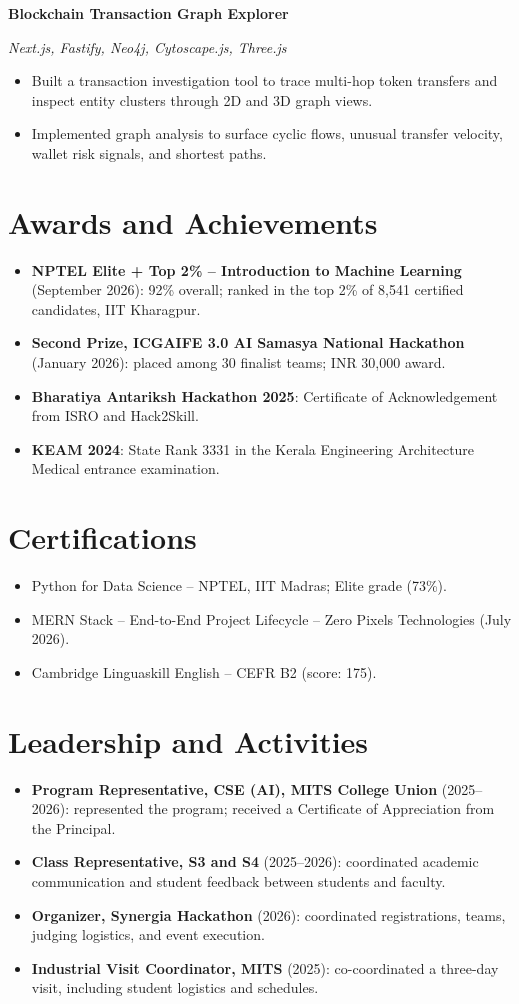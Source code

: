 \documentclass[a4paper,10pt]{article}
\newcommand{\project}[3]{%
  \noindent\textbf{#1}\hfill{\small #2}\par
  {\small\emph{#3}}\par\vspace{-2pt}%
}
\begin{document}
\project{Blockchain Transaction Graph Explorer}{}{Next.js, Fastify, Neo4j, Cytoscape.js, Three.js}
\begin{itemize}
  \item Built a transaction investigation tool to trace multi-hop token transfers and inspect entity clusters through 2D and 3D graph views.
  \item Implemented graph analysis to surface cyclic flows, unusual transfer velocity, wallet risk signals, and shortest paths.
\end{itemize}

\section{Awards and Achievements}
\begin{itemize}
  \item \textbf{NPTEL Elite + Top 2\% -- Introduction to Machine Learning} (September 2026): 92\% overall; ranked in the top 2\% of 8,541 certified candidates, IIT Kharagpur.
  \item \textbf{Second Prize, ICGAIFE 3.0 AI Samasya National Hackathon} (January 2026): placed among 30 finalist teams; INR 30,000 award.
  \item \textbf{Bharatiya Antariksh Hackathon 2025}: Certificate of Acknowledgement from ISRO and Hack2Skill.
  \item \textbf{KEAM 2024}: State Rank 3331 in the Kerala Engineering Architecture Medical entrance examination.
\end{itemize}

\section{Certifications}
\begin{itemize}
  \item Python for Data Science -- NPTEL, IIT Madras; Elite grade (73\%).
  \item MERN Stack -- End-to-End Project Lifecycle -- Zero Pixels Technologies (July 2026).
  \item Cambridge Linguaskill English -- CEFR B2 (score: 175).
\end{itemize}

\section{Leadership and Activities}
\begin{itemize}
  \item \textbf{Program Representative, CSE (AI), MITS College Union} (2025--2026): represented the program; received a Certificate of Appreciation from the Principal.
  \item \textbf{Class Representative, S3 and S4} (2025--2026): coordinated academic communication and student feedback between students and faculty.
  \item \textbf{Organizer, Synergia Hackathon} (2026): coordinated registrations, teams, judging logistics, and event execution.
  \item \textbf{Industrial Visit Coordinator, MITS} (2025): co-coordinated a three-day visit, including student logistics and schedules.
\end{itemize}
\end{document}
